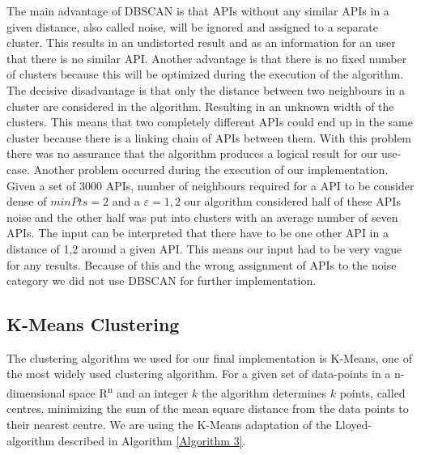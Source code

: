 \documentclass[a4paper]{IEEEtran}
\begin{document}
The main advantage of DBSCAN is that APIs without any similar APIs in a given distance, also called noise, will be ignored and assigned to a separate cluster. This results in an undistorted result and as an information for an user that there is no similar API. 
Another advantage is that there is no fixed number of clusters because this will be optimized during the execution of the algorithm.
The decisive disadvantage is that only the distance between two neighbours in a cluster are considered in the algorithm. Resulting in an unknown width of the clusters. This means that two completely different APIs could end up in the same cluster because there is a linking chain of APIs between them. With this problem there was no assurance that the algorithm produces a logical result for our use-case.
Another problem occurred during the execution of our implementation. Given a set of 3000 APIs, number of neighbours required for a API to be consider dense of $minPts = 2$ and a $ε = 1,2$ our algorithm considered half of these APIs noise and the other half was put into clusters with an average number of seven APIs. The input can be interpreted that there have to be one other API in a distance of 1,2 around a given API. This means our input had to be very vague for any results. Because of this and the wrong assignment of APIs to the noise category we did not use DBSCAN for further implementation.

\subsection{K-Means Clustering}
The clustering algorithm we used for our final implementation is K-Means, one of the most widely used clustering algorithm. For a given set of data-points in a n-dimensional space R\textsuperscript{n} and an integer $k$ the algorithm determines $k$ points, called centres, minimizing the sum of the mean square distance from the data points to their nearest centre. We are using the K-Means adaptation of the Lloyed-algorithm described in Algorithm \ref{Algorithm 3}\cite{nazeer2009improving}.
\end{document}
